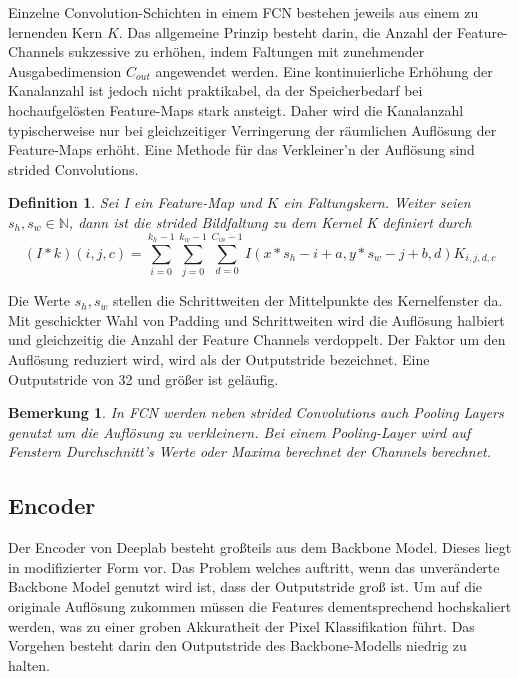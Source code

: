 \documentclass[12pt,DIV=15,BCOR=15mm,twoside,headsepline,abstract=true,listof=totoc,bibliography=totoc]{scrreprt}
\newtheorem{remark}{Bemerkung}[chapter]
\newtheorem{defi}{Definition}
\theoremstyle{remark}    %
\begin{document}
    Einzelne Convolution-Schichten in einem \ac{FCN} bestehen jeweils aus einem zu lernenden Kern $K$. Das allgemeine Prinzip besteht darin, die Anzahl der 
    Feature-Channels sukzessive zu erhöhen, indem Faltungen mit zunehmender Ausgabedimension $C_{out}$ angewendet werden. Eine kontinuierliche Erhöhung der 
    Kanalanzahl ist jedoch nicht praktikabel, da der Speicherbedarf bei hochaufgelösten Feature-Maps stark ansteigt.
    Daher wird die Kanalanzahl typischerweise nur bei gleichzeitiger Verringerung der räumlichen Auflösung der Feature-Maps erhöht. Eine Methode 
    für das Verkleiner'n der Auflösung sind strided Convolutions.
    \begin{defi}
    Sei I ein Feature-Map und $K$ ein Faltungskern. Weiter seien $s_h, s_w \in \mathbb{N}$, dann ist die 
    strided Bildfaltung zu dem Kernel K definiert durch 
    \[
    (I * k)(i, j, c) = \sum_{i =0}^{k_h-1}\sum_{j=0}^{k_w-1} \sum_{d = 0}^{C_{in}-1}I(x *s_h-i +a, y*s_w-j+b, d)K_{i,j,d,c}
    \]
    \end{defi}\noindent
    Die Werte $s_h, s_w$ stellen die Schrittweiten der Mittelpunkte des Kernelfenster da. Mit geschickter Wahl von Padding und Schrittweiten wird 
    die Auflösung halbiert und gleichzeitig die Anzahl der Feature Channels verdoppelt. Der Faktor um den Auflösung reduziert 
    wird, wird als der Outputstride bezeichnet. Eine Outputstride von 32 und größer ist geläufig. 
    \begin{remark}
    In \ac{FCN} werden neben strided Convolutions auch Pooling Layers genutzt um die Auflösung zu verkleinern. Bei einem Pooling-Layer wird auf Fenstern
    Durchschnitt's Werte oder Maxima berechnet der Channels berechnet.
    \end{remark}

    \subsection{Encoder}
    Der Encoder von Deeplab besteht großteils aus dem Backbone Model. Dieses liegt in modifizierter Form vor. 
    Das Problem welches auftritt, wenn das unveränderte Backbone Model genutzt wird ist, dass der Outputstride groß ist. Um auf die originale Auflösung 
    zukommen müssen die  Features dementsprechend hochskaliert werden, was zu einer groben Akkuratheit der Pixel Klassifikation führt. 
    Das Vorgehen besteht darin den Outputstride des Backbone-Modells niedrig zu halten.
\end{document}
